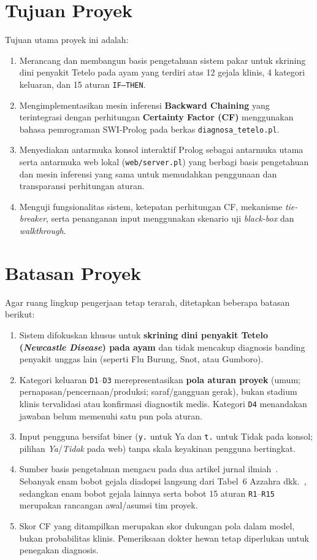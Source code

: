 \documentclass[12pt,a4paper]{report}
\begin{document}
\section{Tujuan Proyek}
Tujuan utama proyek ini adalah:
\begin{enumerate}
  \item Merancang dan membangun basis pengetahuan sistem pakar untuk skrining dini penyakit Tetelo pada ayam yang terdiri atas 12 gejala klinis, 4 kategori keluaran, dan 15 aturan \texttt{IF--THEN}.
  \item Mengimplementasikan mesin inferensi \textbf{Backward Chaining} yang terintegrasi dengan perhitungan \textbf{Certainty Factor (CF)} menggunakan bahasa pemrograman SWI-Prolog pada berkas \texttt{diagnosa\_tetelo.pl}.
  \item Menyediakan antarmuka konsol interaktif Prolog sebagai antarmuka utama serta antarmuka web lokal (\texttt{web/server.pl}) yang berbagi basis pengetahuan dan mesin inferensi yang sama untuk memudahkan penggunaan dan transparansi perhitungan aturan.
  \item Menguji fungsionalitas sistem, ketepatan perhitungan CF, mekanisme \textit{tie-breaker}, serta penanganan input menggunakan skenario uji \textit{black-box} dan \textit{walkthrough}.
\end{enumerate}

\section{Batasan Proyek}
Agar ruang lingkup pengerjaan tetap terarah, ditetapkan beberapa batasan berikut:
\begin{enumerate}
  \item Sistem difokuskan khusus untuk \textbf{skrining dini penyakit Tetelo (\textit{Newcastle Disease}) pada ayam} dan tidak mencakup diagnosis banding penyakit unggas lain (seperti Flu Burung, Snot, atau Gumboro).
  \item Kategori keluaran \texttt{D1}--\texttt{D3} merepresentasikan \textbf{pola aturan proyek} (umum; pernapasan/pencernaan/produksi; saraf/gangguan gerak), bukan stadium klinis tervalidasi atau konfirmasi diagnostik medis. Kategori \texttt{D4} menandakan jawaban belum memenuhi satu pun pola aturan.
  \item Input pengguna bersifat biner (\texttt{y.} untuk Ya dan \texttt{t.} untuk Tidak pada konsol; pilihan \textit{Ya}/\textit{Tidak} pada web) tanpa skala keyakinan pengguna bertingkat.
  \item Sumber basis pengetahuan mengacu pada dua artikel jurnal ilmiah~\cite{azzahra2026,ahsyar2021}. Sebanyak enam bobot gejala diadopsi langsung dari Tabel~6 Azzahra dkk.~\cite{azzahra2026}, sedangkan enam bobot gejala lainnya serta bobot 15 aturan \texttt{R1}--\texttt{R15} merupakan rancangan awal/asumsi tim proyek.
  \item Skor CF yang ditampilkan merupakan skor dukungan pola dalam model, bukan probabilitas klinis. Pemeriksaan dokter hewan tetap diperlukan untuk penegakan diagnosis.
\end{enumerate}
\end{document}
